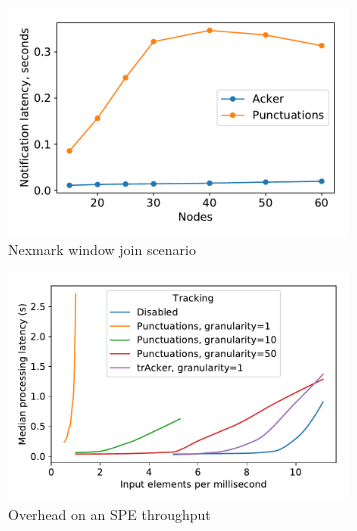 \begin{figure}[t!]
    \begin{subfigure}[b]{0.32\textwidth}
            \includegraphics[width=0.99\textwidth]{pics/nexmark.pdf}
            \caption{Nexmark window join scenario}
            \label{fig:nexmark}
    \end{subfigure}
    \hspace{5mm}
    \begin{subfigure}[b]{0.32\textwidth}
            \includegraphics[width=0.99\textwidth]{pics/throughput_overhead_50.pdf}
            \caption{Overhead on an SPE throughput}
            \label{throughput_overhead}
    \end{subfigure}
    \hspace{5mm}
    \begin{subfigure}[b]{0.32\textwidth}

\end{subfigure}
\end{figure}
